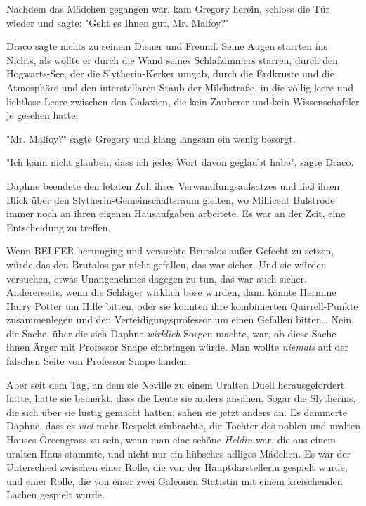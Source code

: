 {Nachdem das Mädchen gegangen war, kam Gregory herein, schloss die Tür wieder und sagte: "Geht es Ihnen gut, Mr. Malfoy?"

Draco sagte nichts zu seinem Diener und Freund. Seine Augen starrten ins Nichts, als wollte er durch die Wand seines Schlafzimmers starren, durch den Hogwarts-See, der die Slytherin-Kerker umgab, durch die Erdkruste und die Atmosphäre und den interstellaren Staub der Milchstraße, in die völlig leere und lichtlose Leere zwischen den Galaxien, die kein Zauberer und kein Wissenschaftler je gesehen hatte.

"Mr. Malfoy?" sagte Gregory und klang langsam ein wenig besorgt.

"Ich kann nicht glauben, dass ich jedes Wort davon geglaubt habe", sagte Draco.

Daphne beendete den letzten Zoll ihres Verwandlungsaufsatzes und ließ ihren Blick über den Slytherin-Gemeinschaftsraum gleiten, wo Millicent Bulstrode immer noch an ihren eigenen Hausaufgaben arbeitete. Es war an der Zeit, eine Entscheidung zu treffen.

Wenn BELFER herumging und versuchte Brutalos außer Gefecht zu setzen, würde das den Brutalos gar nicht gefallen, das war sicher. Und sie würden versuchen, etwas Unangenehmes dagegen zu tun, das war auch sicher. Andererseits, wenn die Schläger wirklich böse wurden, dann könnte Hermine Harry Potter um Hilfe bitten, oder sie könnten ihre kombinierten Quirrell-Punkte zusammenlegen und den Verteidigungsprofessor um einen Gefallen bitten… Nein, die Sache, über die sich Daphne \emph{wirklich} Sorgen machte, war, ob diese Sache ihnen Ärger mit Professor Snape einbringen würde. Man wollte \emph{niemals} auf der falschen Seite von Professor Snape landen.

Aber seit dem Tag, an dem sie Neville zu einem Uralten Duell herausgefordert hatte, hatte sie bemerkt, dass die Leute sie anders ansahen. Sogar die Slytherins, die sich über sie lustig gemacht hatten, sahen sie jetzt anders an. Es dämmerte Daphne, dass es \emph{viel} mehr Respekt einbrachte, die Tochter des noblen und uralten Hauses Greengrass zu sein, wenn man eine schöne \emph{Heldin} war, die aus einem uralten Haus stammte, und nicht nur ein hübsches adliges Mädchen. Es war der Unterschied zwischen einer Rolle, die von der Hauptdarstellerin gespielt wurde, und einer Rolle, die von einer zwei Galeonen Statistin mit einem kreischenden Lachen gespielt wurde.

}
